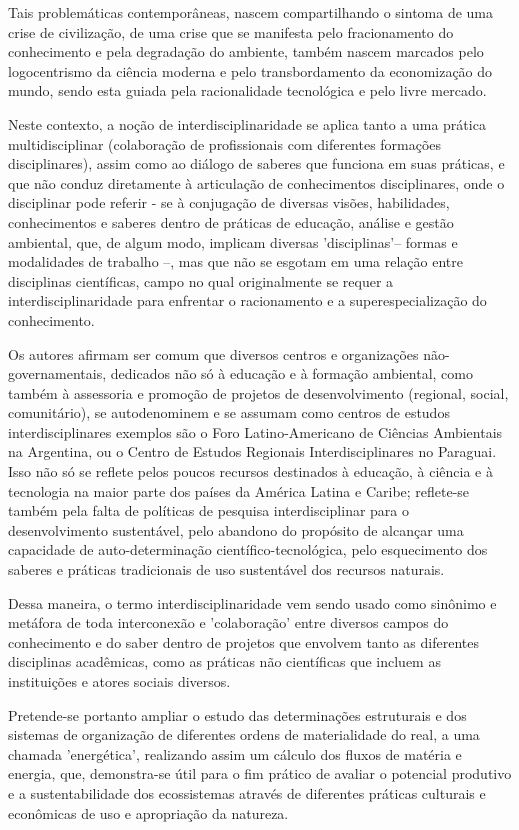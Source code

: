 \documentclass[
   article,       %
   12pt,          %
   oneside,       %
   a4paper,       %
   english,       %
   brazil,           %
   sumario=tradicional
   ]{abntex2}
\begin{document}
Tais problemáticas contemporâneas, nascem compartilhando o sintoma de uma crise de civilização, de uma crise que se manifesta pelo fracionamento do conhecimento e pela degradação do ambiente, também nascem marcados pelo logocentrismo da ciência moderna e pelo transbordamento da
economização do mundo, sendo esta guiada pela racionalidade tecnológica e pelo livre mercado.

Neste contexto, a noção de interdisciplinaridade se aplica tanto a uma prática multidisciplinar (colaboração de profissionais com diferentes formações disciplinares), assim como ao diálogo de saberes que funciona em suas práticas, e que não conduz diretamente à articulação de conhecimentos disciplinares, onde o disciplinar pode referir - se à conjugação de diversas visões, habilidades, conhecimentos e saberes dentro de práticas de educação, análise e gestão ambiental, que, de algum modo, implicam diversas 'disciplinas'– formas e modalidades de trabalho –, mas que não se esgotam em uma relação entre disciplinas científicas, campo no qual originalmente se requer a interdisciplinaridade para enfrentar o racionamento e a superespecialização do conhecimento.

Os autores afirmam ser comum que diversos centros e organizações não-governamentais, dedicados não só à educação e à formação ambiental, como também à assessoria e promoção de projetos de desenvolvimento (regional, social, comunitário), se autodenominem e se assumam como centros de estudos interdisciplinares exemplos são o Foro Latino-Americano de Ciências Ambientais na Argentina, ou o Centro de Estudos Regionais Interdisciplinares no Paraguai. 
Isso não só se reflete pelos poucos recursos destinados à educação, à ciência e à tecnologia na maior parte dos países da América Latina e Caribe; reflete-se também pela falta de políticas de pesquisa interdisciplinar para o desenvolvimento sustentável, pelo abandono do propósito de alcançar uma capacidade de auto-determinação científico-tecnológica, pelo esquecimento dos saberes e práticas tradicionais de uso sustentável dos recursos naturais. 

Dessa maneira, o termo interdisciplinaridade vem sendo usado como sinônimo e metáfora de toda interconexão e 'colaboração' entre diversos campos do conhecimento e do saber dentro de projetos que envolvem tanto as diferentes disciplinas acadêmicas, como as práticas não científicas que incluem as instituições e atores sociais diversos.

Pretende-se portanto ampliar o estudo das determinações estruturais e dos sistemas de organização de diferentes ordens de materialidade do real, a uma chamada ’energética’, realizando assim um cálculo dos fluxos de matéria e energia, que, demonstra-se útil para o fim prático de avaliar
o potencial produtivo e a sustentabilidade dos ecossistemas através de diferentes práticas culturais e
econômicas de uso e apropriação da natureza. 
\end{document}
